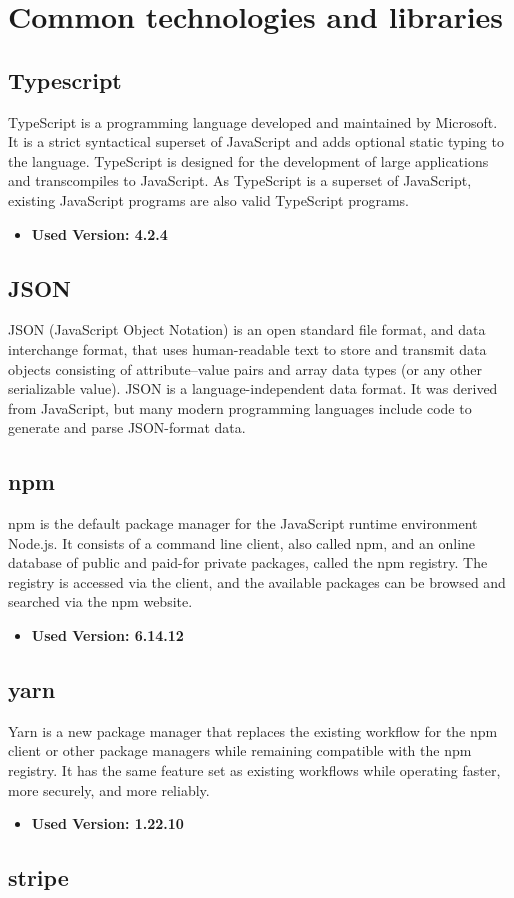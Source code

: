 \section{Common technologies and libraries}
\subsection{Typescript}
TypeScript is a programming language developed and maintained by Microsoft. It is a strict syntactical
superset of JavaScript and adds optional static typing to the language. TypeScript is designed for the
development of large applications and transcompiles to JavaScript. As TypeScript is a superset of JavaScript,
existing JavaScript programs are also valid TypeScript programs.
\begin{itemize}
  \item \textbf{Used Version: 4.2.4}
\end{itemize}
\subsection{JSON}
JSON (JavaScript Object Notation) is an open standard file format, and data interchange format, that
uses human-readable text to store and transmit data objects consisting of attribute–value pairs and
array data types (or any other serializable value).
JSON is a language-independent data format. It was derived from JavaScript,
but many modern programming languages include code to generate and parse JSON-format data.
\subsection{npm}
npm is the default package manager for the JavaScript runtime environment Node.js.
It consists of a command line client, also called npm, and an online database of public and paid-for private packages,
called the npm registry. The registry is accessed via the client, and the available packages can be browsed and
searched via the npm website.
\begin{itemize}
  \item \textbf{Used Version: 6.14.12}
\end{itemize}
\subsection{yarn}
Yarn is a new package manager that replaces the existing workflow for the npm client or other package managers while
remaining compatible with the npm registry. It has the same feature set as existing workflows while operating faster,
more securely, and more reliably.
\begin{itemize}
  \item \textbf{Used Version: 1.22.10}
\end{itemize}
\subsection{stripe}